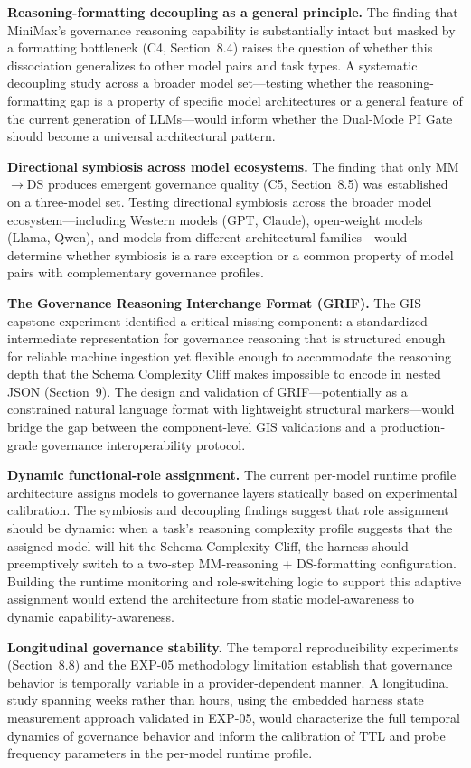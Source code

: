 \documentclass[11pt,a4paper]{article}
\begin{document}
\textbf{Reasoning-formatting decoupling as a general principle.} The finding that MiniMax's governance reasoning capability is substantially intact but masked by a formatting bottleneck (C4, Section~8.4) raises the question of whether this dissociation generalizes to other model pairs and task types. A systematic decoupling study across a broader model set---testing whether the reasoning-formatting gap is a property of specific model architectures or a general feature of the current generation of LLMs---would inform whether the Dual-Mode PI Gate should become a universal architectural pattern.

\textbf{Directional symbiosis across model ecosystems.} The finding that only MM$\rightarrow$DS produces emergent governance quality (C5, Section~8.5) was established on a three-model set. Testing directional symbiosis across the broader model ecosystem---including Western models (GPT, Claude), open-weight models (Llama, Qwen), and models from different architectural families---would determine whether symbiosis is a rare exception or a common property of model pairs with complementary governance profiles.

\textbf{The Governance Reasoning Interchange Format (GRIF).} The GIS capstone experiment identified a critical missing component: a standardized intermediate representation for governance reasoning that is structured enough for reliable machine ingestion yet flexible enough to accommodate the reasoning depth that the Schema Complexity Cliff makes impossible to encode in nested JSON (Section~9). The design and validation of GRIF---potentially as a constrained natural language format with lightweight structural markers---would bridge the gap between the component-level GIS validations and a production-grade governance interoperability protocol.

\textbf{Dynamic functional-role assignment.} The current per-model runtime profile architecture assigns models to governance layers statically based on experimental calibration. The symbiosis and decoupling findings suggest that role assignment should be dynamic: when a task's reasoning complexity profile suggests that the assigned model will hit the Schema Complexity Cliff, the harness should preemptively switch to a two-step MM-reasoning + DS-formatting configuration. Building the runtime monitoring and role-switching logic to support this adaptive assignment would extend the architecture from static model-awareness to dynamic capability-awareness.

\textbf{Longitudinal governance stability.} The temporal reproducibility experiments (Section~8.8) and the EXP-05 methodology limitation establish that governance behavior is temporally variable in a provider-dependent manner. A longitudinal study spanning weeks rather than hours, using the embedded harness state measurement approach validated in EXP-05, would characterize the full temporal dynamics of governance behavior and inform the calibration of TTL and probe frequency parameters in the per-model runtime profile.
\end{document}
